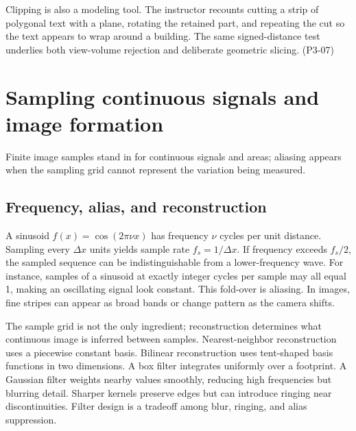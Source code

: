 Clipping is also a modeling tool. The instructor recounts cutting a strip of polygonal text with a plane, rotating the retained part, and repeating the cut so the text appears to wrap around a building. The same signed-distance test underlies both view-volume rejection and deliberate geometric slicing. (P3-07)

\section{Sampling continuous signals and image formation}\label{03-visual-computing-i-ch003-sampling-continuous-signals-and-image-formation}

\hypertarget{03-visual-computing-i-ch003-sampling-continuous-signals-and-image-formation}{}

Finite image samples stand in for continuous signals and areas; aliasing appears when the sampling grid cannot represent the variation being measured.

\subsection{Frequency, alias, and reconstruction}\label{03-visual-computing-i-ch003-frequency-alias-and-reconstruction}

\hypertarget{03-visual-computing-i-ch003-frequency-alias-and-reconstruction}{}

A sinusoid \(f(x)=\cos(2\pi \nu x)\) has frequency \(\nu\) cycles per unit distance. Sampling every \(\Delta x\) units yields sample rate \(f_s=1/\Delta x\). If frequency exceeds \(f_s/2\), the sampled sequence can be indistinguishable from a lower-frequency wave. For instance, samples of a sinusoid at exactly integer cycles per sample may all equal 1, making an oscillating signal look constant. This fold-over is aliasing. In images, fine stripes can appear as broad bands or change pattern as the camera shifts.

The sample grid is not the only ingredient; reconstruction determines what continuous image is inferred between samples. Nearest-neighbor reconstruction uses a piecewise constant basis. Bilinear reconstruction uses tent-shaped basis functions in two dimensions. A box filter integrates uniformly over a footprint. A Gaussian filter weights nearby values smoothly, reducing high frequencies but blurring detail. Sharper kernels preserve edges but can introduce ringing near discontinuities. Filter design is a tradeoff among blur, ringing, and alias suppression.

